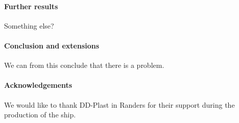 \documentclass[a0,portrait]{a0poster}
\begin{document}
\begin{center}
{\paragraph{Further results}
Something else?
\paragraph{Conclusion and extensions}
We can from this conclude that there is a problem.
\paragraph{Acknowledgements} We would like to thank DD-Plast in Randers for their support during the production of the ship.


}
\end{center}


\makefooter
\end{document}
